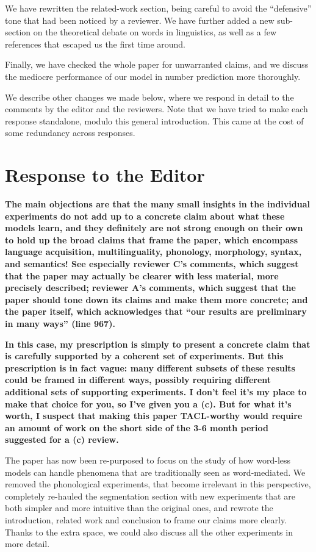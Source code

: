 \documentclass{article}
\begin{document}
We have rewritten the related-work section, being careful to avoid the ``defensive'' tone that had been noticed by a reviewer. We have further added a new sub-section on the theoretical debate on words in linguistics, as well as a few references that escaped us the first time around.

Finally, we have checked the whole paper for unwarranted claims, and we discuss the mediocre performance of our model in number prediction more thoroughly.

We describe other changes we made below, where we respond in detail to the comments by the editor and the reviewers. Note that we have tried to make each response standalone, modulo this general introduction. This came at the cost of some redundancy across responses.


\section{Response to the Editor}

\textbf{The main objections are that the many small insights in the individual experiments do not add up to a concrete claim about what these models learn, and they definitely are not strong enough on their own to hold up the broad claims that frame the paper, which encompass language acquisition, multilinguality, phonology, morphology, syntax, and semantics! See especially reviewer C's comments, which suggest that the paper may actually be clearer with less material, more precisely described; reviewer A's comments, which suggest that the paper should tone down its claims and make them more concrete; and the paper itself, which acknowledges that ``our results are preliminary in many ways'' (line 967).}

\textbf{In this case, my prescription is simply to present a concrete claim that is carefully supported by a coherent set of experiments. But this prescription is in fact vague: many different subsets of these results could be framed in different ways, possibly requiring different additional sets of supporting experiments. I don't feel it's my place to make that choice for you, so I've given you a (c). But for what it's worth, I suspect that making this paper TACL-worthy would require an amount of work on the short side of the 3-6 month period suggested for a (c) review.}

The paper has now been re-purposed to focus on the study of how word-less models can handle phenomena that are traditionally seen as word-mediated. We removed the phonological experiments, that become irrelevant in this perspective, completely re-hauled the segmentation section with new experiments that are both simpler and more intuitive than the original ones, and rewrote the introduction, related work and conclusion to frame our claims more clearly. Thanks to the extra space, we could also discuss all the other experiments in more detail.
\end{document}
